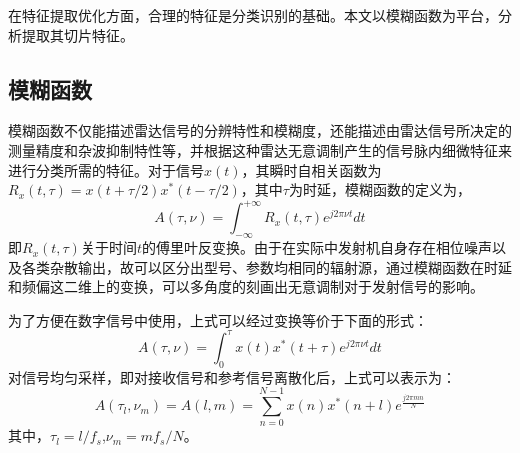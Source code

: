 在特征提取优化方面，合理的特征是分类识别的基础。本文以模糊函数为平台，分析提取其切片特征。

\subsection{模糊函数}

模糊函数不仅能描述雷达信号的分辨特性和模糊度，还能描述由雷达信号所决定的测量精度和杂波抑制特性等，并根据这种雷达无意调制产生的信号脉内细微特征来进行分类所需的特征。对于信号$x(t)$，其瞬时自相关函数为$R_x(t,\tau)=x(t+\tau/2)x^{*}(t-\tau/2)$，其中$\tau$为时延，模糊函数的定义为，
\begin{equation}
A(\tau,\nu) = \int_{-\infty}^{+\infty}R_x(t,\tau)e^{j2\pi\nu t}dt
\end{equation}
即$R_x(t,\tau)$关于时间$t$的傅里叶反变换。由于在实际中发射机自身存在相位噪声以及各类杂散输出，故可以区分出型号、参数均相同的辐射源，通过模糊函数在时延和频偏这二维上的变换，可以多角度的刻画出无意调制对于发射信号的影响。

为了方便在数字信号中使用，上式可以经过变换等价于下面的形式：
\begin{equation}
A(\tau,\nu) = \int_{0}^{\tau}x(t)x^{*}(t+\tau)e^{j2\pi\nu t}dt
\end{equation}
对信号均匀采样，即对接收信号和参考信号离散化后，上式可以表示为：
\begin{equation}
A(\tau_l,\nu_m) = A(l, m) = \sum_{n = 0}^{N-1}x(n)x^{*}(n+l)e^{\frac{j2\pi m n}{N}}	
\end{equation}
其中，$\tau_l=l/f_s$,$\nu_m=mf_s/N$。

